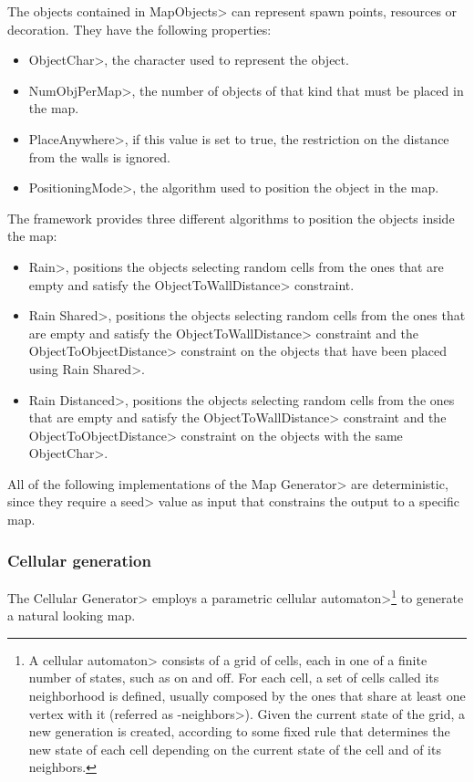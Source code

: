The objects contained in \<MapObjects> can represent spawn points, resources or decoration. They have the following properties:

\begin{itemize}
\item \<ObjectChar>, the character used to represent the object.
\item \<NumObjPerMap>,  the number of objects of that kind that must be placed in the map.
\item \<PlaceAnywhere>, if this value is set to true, the restriction on the distance from the walls is ignored.
\item \<PositioningMode>, the algorithm used to position the object in the map.
\end{itemize}

The framework provides three different algorithms to position the objects inside the map:

\begin{itemize}
\item \<Rain>, positions the objects selecting random cells from the ones that are empty and satisfy the  \<ObjectToWallDistance> constraint.
\item \<Rain Shared>, positions the objects selecting random cells from the ones that are empty and satisfy the  \<ObjectToWallDistance> constraint and the \<ObjectToObjectDistance> constraint on the objects that have been placed using \<Rain Shared>.
\item \<Rain Distanced>, positions the objects selecting random cells from the ones that are empty and satisfy the  \<ObjectToWallDistance> constraint and the \<ObjectToObjectDistance> constraint on the objects with the same \<ObjectChar>.
\end{itemize}

All of the following implementations of the \<Map Generator> are deterministic, since they require a \<seed> value as input that constrains the output to a specific map.


\subsubsection{Cellular generation}

The \<Cellular Generator> employs a parametric \<cellular automaton>\footnote{A \<cellular automaton> consists of a grid of cells, each in one of a finite number of states, such as on and off. For each cell, a set of cells called its neighborhood is defined, usually composed by the ones that share at least one vertex with it (referred as -neighbors>). Given the current state of the grid, a new generation is created, according to some fixed rule that determines the new state of each cell depending on the current state of the cell and of its neighbors.} to generate a natural looking map. 

